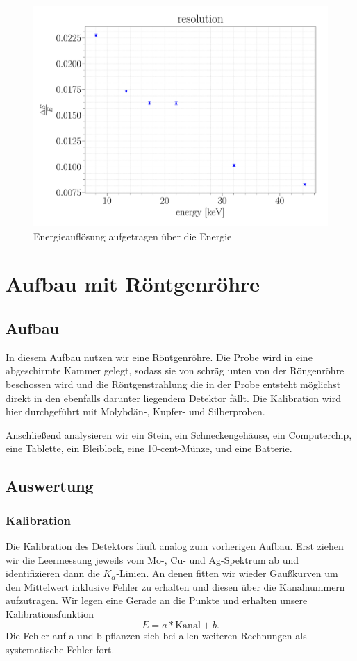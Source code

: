 \documentclass[a4paper,14pt]{article}
\begin{document}
\begin{figure}[H]
\centering
\includegraphics[scale=0.25]{../Figures/am_resolution.pdf}
\caption{Energieauflösung aufgetragen über die Energie}
\label{am_resolution}
\end{figure}

\section{Aufbau mit Röntgenröhre}
\subsection{Aufbau}
In diesem Aufbau nutzen wir eine Röntgenröhre. Die Probe wird in eine abgeschirmte Kammer gelegt, sodass sie von schräg unten von der Röngenröhre beschossen wird und die Röntgenstrahlung die in der Probe entsteht möglichst direkt in den ebenfalls darunter liegendem Detektor fällt. Die Kalibration wird hier durchgeführt mit Molybdän-, Kupfer- und Silberproben.

Anschließend analysieren wir ein Stein, ein Schneckengehäuse, ein Computerchip, eine Tablette, ein Bleiblock, eine 10-cent-Münze, und eine Batterie.

\subsection{Auswertung}
\subsubsection{Kalibration}
Die Kalibration des Detektors läuft analog zum vorherigen Aufbau. Erst ziehen wir die Leermessung jeweils vom Mo-, Cu- und Ag-Spektrum ab und identifizieren dann die $K_\alpha$-Linien. An denen fitten wir wieder Gaußkurven um den Mittelwert inklusive Fehler zu erhalten und diesen über die Kanalnummern aufzutragen. Wir legen eine Gerade an die Punkte und erhalten unsere Kalibrationsfunktion
\begin{equation}
	E = a * \mathrm{Kanal} + b.
\end{equation}
Die Fehler auf a und b pflanzen sich bei allen weiteren Rechnungen als systematische Fehler fort.
\end{document}
